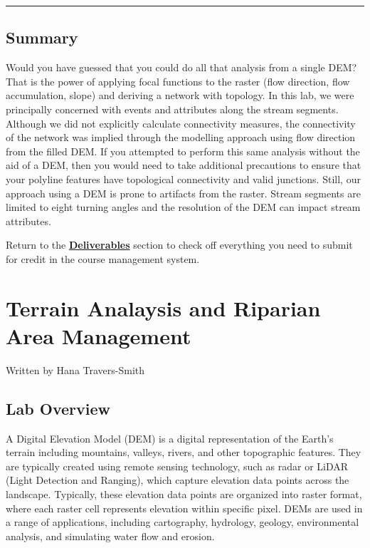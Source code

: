 \documentclass[
]{book}
\begin{document}
\begin{center}\rule{0.5\linewidth}{0.5pt}\end{center}

\hypertarget{summary-1}{%
\section*{Summary}\label{summary-1}}

Would you have guessed that you could do all that analysis from a single DEM? That is the power of applying focal functions to the raster (flow direction, flow accumulation, slope) and deriving a network with topology. In this lab, we were principally concerned with events and attributes along the stream segments. Although we did not explicitly calculate connectivity measures, the connectivity of the network was implied through the modelling approach using flow direction from the filled DEM. If you attempted to perform this same analysis without the aid of a DEM, then you would need to take additional precautions to ensure that your polyline features have topological connectivity and valid junctions. Still, our approach using a DEM is prone to artifacts from the raster. Stream segments are limited to eight turning angles and the resolution of the DEM can impact stream attributes.

Return to the \protect\hyperlink{lab2-deliverables}{\textbf{Deliverables}} section to check off everything you need to submit for credit in the course management system.

\hypertarget{hydrology-analysis}{%
\chapter{Terrain Analaysis and Riparian Area Management}\label{hydrology-analysis}}

Written by
Hana Travers-Smith

\hypertarget{lab-overview-2}{%
\section*{Lab Overview}\label{lab-overview-2}}

A Digital Elevation Model (DEM) is a digital representation of the Earth's terrain including mountains, valleys, rivers, and other topographic features. They are typically created using remote sensing technology, such as radar or LiDAR (Light Detection and Ranging), which capture elevation data points across the landscape. Typically, these elevation data points are organized into raster format, where each raster cell represents elevation within specific pixel. DEMs are used in a range of applications, including cartography, hydrology, geology, environmental analysis, and simulating water flow and erosion.
\end{document}
